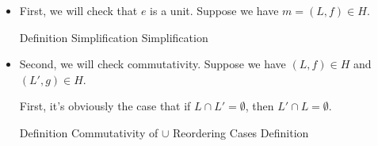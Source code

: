 \begin{itemize}

\item First, we will check that $e$ is a unit. Suppose we have $m = (L, f) \in H$. 

\begin{eqnproof}
        {Definition}
        {Simplification}
        {Simplification}
\end{eqnproof}

\item Second, we will check commutativity. Suppose we have $(L,f) \in H$ and $(L',g) \in H$. 

  First, it's obviously the case that if $L \cap L' = \emptyset$, then $L' \cap L = \emptyset$. 

  \begin{eqnproof}
          {Definition}
          {Commutativity of $\cup$}
          {Reordering Cases}
          {Definition}
  \end{eqnproof}


\end{itemize}
